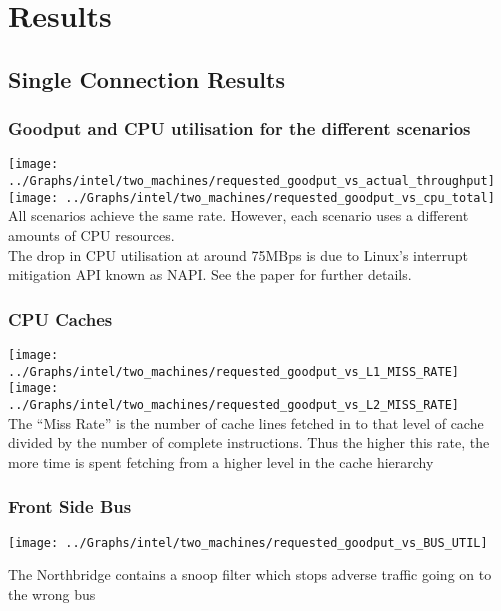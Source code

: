\documentclass{beamer}
\begin{document}
\section{Results}
\subsection[Single Connection Results]{Single Connection Results}
\begin{frame}
	\frametitle{Goodput and CPU utilisation for the different scenarios}
    \texttt{[image: ../Graphs/intel/two\_machines/requested\_goodput\_vs\_actual\_throughput]}
    \texttt{[image: ../Graphs/intel/two\_machines/requested\_goodput\_vs\_cpu\_total]}
    \\All scenarios achieve the same rate. However, each scenario uses a different amounts of CPU resources.
     \\The drop in CPU utilisation at around 75MBps is due to Linux's interrupt mitigation API known as NAPI. See the paper for further details.
\end{frame}

%

\begin{frame}
	\frametitle{CPU Caches}
    \texttt{[image: ../Graphs/intel/two\_machines/requested\_goodput\_vs\_L1\_MISS\_RATE]}
    \texttt{[image: ../Graphs/intel/two\_machines/requested\_goodput\_vs\_L2\_MISS\_RATE]}
    \\The ``Miss Rate'' is the number of cache lines fetched in to that level of cache divided by the number of complete instructions. Thus the higher this rate, the more time is spent fetching from a higher level in the cache hierarchy
\end{frame}

\begin{frame}
	\frametitle{Front Side Bus}
   \begin{center}
		\texttt{[image: ../Graphs/intel/two\_machines/requested\_goodput\_vs\_BUS\_UTIL]}
	\end{center} 
    The Northbridge contains a snoop filter which stops adverse traffic going on to the wrong bus

\end{frame}
\end{document}

